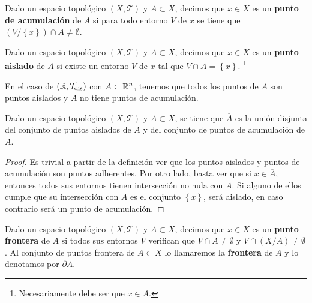 \begin{definition}
	Dado un espacio topológico $\displaystyle \left(X, \mathcal{T}\right) $ y $\displaystyle A \subset X $, decimos que $\displaystyle x \in X $ es un \textbf{punto de acumulación} de $\displaystyle A $ si para todo entorno $\displaystyle V $ de $\displaystyle x $ se tiene que $\displaystyle \left(V/ \left\{ x\right\} \right)\cap A \neq \emptyset $. 
\end{definition}
\begin{definition}
	Dado un espacio topológico $\displaystyle \left(X, \mathcal{T}\right) $ y $\displaystyle A \subset X $, decimos que $\displaystyle x \in X $ es un \textbf{punto aislado} de $\displaystyle A $ si existe un entorno $\displaystyle V $ de $\displaystyle x $ tal que $\displaystyle V \cap A = \left\{ x\right\}  $. \footnote{Necesariamente debe ser que $\displaystyle x \in A $.} 
\end{definition}
\begin{eg}
En el caso de $\displaystyle \left(\mathbb{R}, \mathcal{T}_{\text{dis}}\right) $ con $\displaystyle A \subset \mathbb{R}^{n} $, tenemos que todos los puntos de $\displaystyle A $ son puntos aislados y $\displaystyle A $ no tiene puntos de acumulación. 
\end{eg}
\begin{prop}
Dado un espacio topológico $\displaystyle \left(X, \mathcal{T}\right) $ y $\displaystyle A \subset X $, se tiene que $\displaystyle \overline{A} $ es la unión disjunta del conjunto de puntos aislados de $\displaystyle A $ y del conjunto de puntos de acumulación de $\displaystyle A $.
\end{prop}
\begin{proof}
	Es trivial a partir de la definición ver que los puntos aislados y puntos de acumulación son puntos adherentes. Por otro lado, basta ver que si $\displaystyle x \in \overline{A} $, entonces todos sus entornos tienen intersección no nula con $\displaystyle A $. Si alguno de ellos cumple que su intersección con $\displaystyle A $ es el conjunto $\displaystyle \left\{ x\right\}  $, será aislado, en caso contrario será un punto de acumulación.
\end{proof}
\begin{definition}
Dado un espacio topológico $\displaystyle \left(X, \mathcal{T}\right) $ y $\displaystyle A \subset X $, decimos que $\displaystyle x \in X $ es un \textbf{punto frontera} de $\displaystyle A $ si todos sus entornos $\displaystyle V $ verifican que $\displaystyle V \cap A \neq \emptyset $ y $\displaystyle V \cap \left(X / A\right)\neq \emptyset $. Al conjunto de puntos frontera de $\displaystyle A \subset X $ lo llamaremos la \textbf{frontera} de $\displaystyle A $ y lo denotamos por $\displaystyle \partial A $.
\end{definition}

